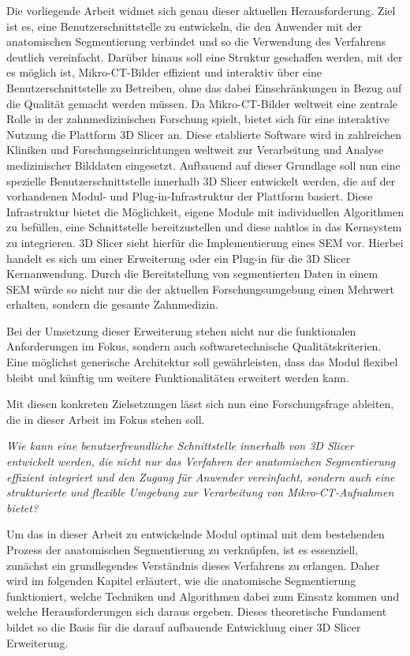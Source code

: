Die vorliegende Arbeit widmet sich genau dieser aktuellen Herausforderung. Ziel
ist es, eine Benutzerschnittstelle zu entwickeln, die den Anwender mit der
anatomischen Segmentierung verbindet und so die Verwendung des Verfahrens
deutlich vereinfacht. Darüber hinaus soll eine Struktur geschaffen werden, mit
der es möglich ist, Mikro-\ac{CT}-Bilder effizient und interaktiv über eine
Benutzerschnittstelle zu Betreiben, ohne das dabei Einschränkungen in Bezug auf die
Qualität gemacht werden müssen. Da Mikro-\ac{CT}-Bilder weltweit eine zentrale Rolle
in der zahnmedizinischen Forschung spielt, bietet sich für eine interaktive
Nutzung die Plattform 3D Slicer an. Diese etablierte Software wird in zahlreichen
Kliniken und Forschungseinrichtungen weltweit zur Verarbeitung und Analyse medizinischer
Bilddaten eingesetzt. Aufbauend auf dieser Grundlage soll nun eine spezielle
Benutzerschnittstelle innerhalb 3D Slicer entwickelt werden, die auf der vorhandenen
Modul- und Plug-in-Infrastruktur der Plattform basiert. Diese Infrastruktur bietet
die Möglichkeit, eigene Module mit individuellen Algorithmen zu befüllen, eine Schnittstelle
bereitzustellen und diese nahtlos in das Kernsystem zu integrieren. 3D Slicer
sieht hierfür die Implementierung eines \ac{SEM} vor. Hierbei handelt es sich um
einer Erweiterung oder ein Plug-in für die 3D Slicer Kernanwendung. Durch die Bereitstellung
von segmentierten Daten in einem \ac{SEM} würde so nicht nur die der aktuellen
Forschungsumgebung einen Mehrwert erhalten, sondern die gesamte Zahnmedizin.

Bei der Umsetzung dieser Erweiterung stehen nicht nur die funktionalen Anforderungen
im Fokus, sondern auch softwaretechnische Qualitätskriterien. Eine möglichst generische
Architektur soll gewährleisten, dass das Modul flexibel bleibt und künftig um
weitere Funktionalitäten erweitert werden kann.

Mit diesen konkreten Zielsetzungen lässt sich nun eine Forschungsfrage ableiten,
die in dieser Arbeit im Fokus stehen soll.

\begin{center}
	\textit{Wie kann eine benutzerfreundliche Schnittstelle innerhalb von 3D
	Slicer entwickelt werden, die nicht nur das Verfahren der anatomischen Segmentierung
	effizient integriert und den Zugang für Anwender vereinfacht, sondern auch
	eine strukturierte und flexible Umgebung zur Verarbeitung von Mikro-\ac{CT}-Aufnahmen
	bietet?}
\end{center}

Um das in dieser Arbeit zu entwickelnde Modul optimal mit dem bestehenden
Prozess der anatomischen Segmentierung zu verknüpfen, ist es essenziell,
zunächst ein grundlegendes Verständnis dieses Verfahrens zu erlangen. Daher wird
im folgenden Kapitel erläutert, wie die anatomische Segmentierung funktioniert, welche
Techniken und Algorithmen dabei zum Einsatz kommen und welche Herausforderungen sich
daraus ergeben. Dieses theoretische Fundament bildet so die Basis für die darauf
aufbauende Entwicklung einer 3D Slicer Erweiterung.

